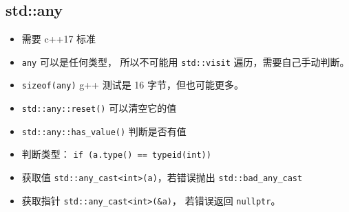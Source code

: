 \subsection{std::any}
\begin{itemize}
\item 需要 c++17 标准
\end{itemize}
\begin{itemize}
\item \verb|any| 可以是任何类型， 所以不可能用 \verb|std::visit| 遍历，需要自己手动判断。
\item \verb|sizeof(any)| g++ 测试是 16 字节，但也可能更多。
\item \verb|std::any::reset()| 可以清空它的值
\item \verb|std::any::has_value()| 判断是否有值
\item 判断类型： \verb|if (a.type() == typeid(int))|
\item 获取值 \verb|std::any_cast<int>(a)|，若错误抛出 \verb|std::bad_any_cast|
\item 获取指针 \verb|std::any_cast<int>(&a)|， 若错误返回 \verb|nullptr|。
\end{itemize}
